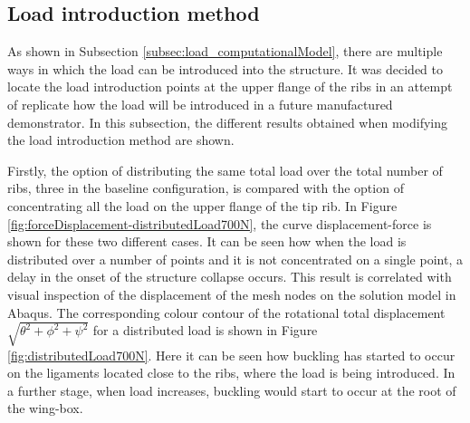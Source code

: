   \clearpage
  \subsection{Load introduction method} \label{subsec:load_results_model}

    As shown in Subsection \ref{subsec:load_computationalModel}, there are multiple ways in which the load can be introduced into the structure. It was decided to locate the load introduction points at the upper flange of the ribs in an attempt of replicate how the load will be introduced in a future manufactured demonstrator. In this subsection, the different results obtained when modifying the load introduction method are shown. 

    Firstly, the option of distributing the same total load over the total number of ribs, three in the baseline configuration, is compared with the option of concentrating all the load on the upper flange of the tip rib. In Figure \ref{fig:forceDisplacement-distributedLoad700N}, the curve displacement-force is shown for these two different cases. It can be seen how when the load is distributed over a number of points and it is not concentrated on a single point, a delay in the onset of the structure collapse occurs. This result is correlated with visual inspection of the displacement of the mesh nodes on the solution model in Abaqus. The corresponding colour contour of the rotational total displacement $\sqrt{\theta^2 + \phi^2 + \psi^2}$ for a distributed load is shown in Figure \ref{fig:distributedLoad700N}. Here it can be seen how buckling has started to occur on the ligaments located close to the ribs, where the load is being introduced. In a further stage, when load increases, buckling would start to occur at the root of the wing-box.

